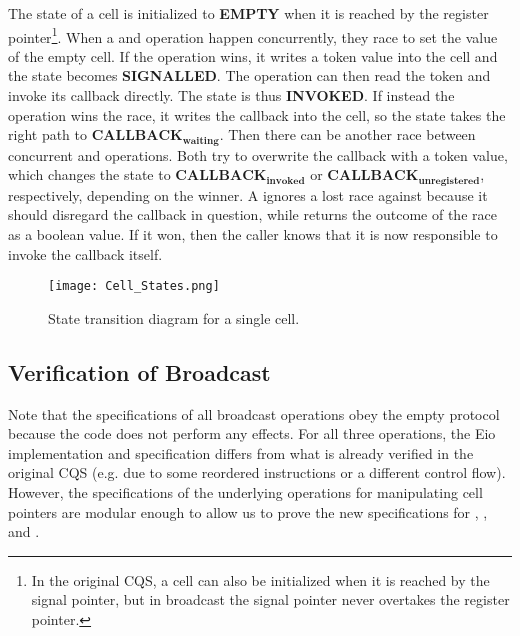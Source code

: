 The state of a cell is initialized to \textbf{EMPTY} when it is reached by the register pointer\footnote{In the original CQS, a cell can also be initialized when it is reached by the signal pointer, but in broadcast the signal pointer never overtakes the register pointer.}.
When a  and  operation happen concurrently, they race to set the value of the empty cell.
If the  operation wins, it writes a token value into the cell and the state becomes \textbf{SIGNALLED}.
The  operation can then read the token and invoke its callback directly.
The state is thus \textbf{INVOKED}.
If instead the  operation wins the race, it writes the callback into the cell, so the state takes the right path to \(\textbf{CALLBACK}_\textbf{waiting}\).
Then there can be another race between concurrent  and  operations.
Both try to overwrite the callback with a token value, which changes the state to \(\textbf{CALLBACK}_\textbf{invoked}\) or \(\textbf{CALLBACK}_\textbf{unregistered}\), respectively, depending on the winner.
A  ignores a lost race against  because it should disregard the callback in question, while  returns the outcome of the race as a boolean value.
If it won, then the caller knows that it is now responsible to invoke the callback itself.

\begin{figure}[ht]
  \texttt{[image: Cell\_States.png]}
  \caption{State transition diagram for a single cell.}
  \label{fig:cqs-cell-states}
\end{figure}

\subsection{Verification of Broadcast}
\label{sec:broadcast-spec}

Note that the specifications of all broadcast operations obey the empty protocol because the code does not perform any effects.
For all three operations, the Eio implementation and specification differs from what is already verified in the original CQS (e.g. due to some reordered instructions or a different control flow).
However, the specifications of the underlying operations for manipulating cell pointers are modular enough to allow us to prove the new specifications for , , and .

